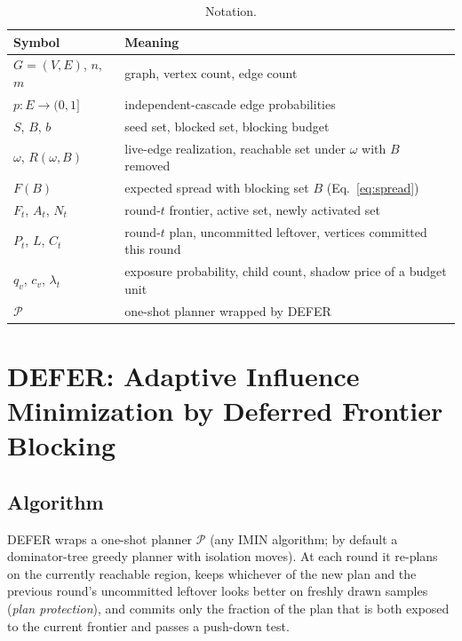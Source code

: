 \documentclass[11pt]{article}
\theoremstyle{definition}
\theoremstyle{remark}
\newcommand{\up}{\rule{0pt}{2.6ex}}
\newcommand{\down}{\rule[-1.2ex]{0pt}{0pt}}
\newcommand{\Rspread}{R}
\newcommand{\FF}{F}
\begin{document}
\begin{table}[h]
\centering
\caption{Notation.}\label{tab:notation}
\small
\begin{tabular}{@{}ll@{}}
\hline
\up Symbol & Meaning \\
\hline
\up $G=(V,E)$, $n$, $m$ & graph, vertex count, edge count \\
$p:E\to(0,1]$ & independent-cascade edge probabilities \\
$S$, $B$, $b$ & seed set, blocked set, blocking budget \\
$\omega$, $\Rspread(\omega,B)$ & live-edge realization, reachable set under $\omega$ with $B$ removed \\
$\FF(B)$ & expected spread with blocking set $B$ (Eq.~\ref{eq:spread}) \\
$F_t$, $A_t$, $N_t$ & round-$t$ frontier, active set, newly activated set \\
$P_t$, $L$, $C_t$ & round-$t$ plan, uncommitted leftover, vertices committed this round \\
$q_v$, $c_v$, $\lambda_t$ & exposure probability, child count, shadow price of a budget unit \\
\down $\mathcal P$ & one-shot planner wrapped by DEFER \\
\hline
\end{tabular}
\end{table}
\section{DEFER: Adaptive Influence Minimization by Deferred Frontier Blocking}\label{sec:defer}

\subsection{Algorithm}\label{sec:defer-algo}

DEFER wraps a one-shot planner $\mathcal P$ (any IMIN algorithm; by default
a dominator-tree greedy planner with isolation moves). At each round it
re-plans on the currently reachable region, keeps whichever of the new plan
and the previous round's uncommitted leftover looks better on freshly drawn
samples (\emph{plan protection}), and commits only the fraction of the plan
that is both exposed to the current frontier and passes a push-down test.
\end{document}
